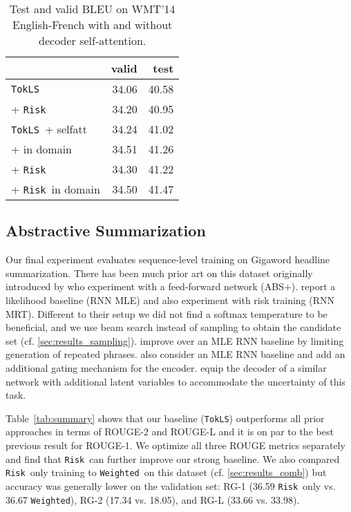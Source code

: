 \documentclass[11pt,a4paper]{article}
\newcommand{\TokLS}{\texttt{TokLS}}
\newcommand{\Risk}{\texttt{Risk}}
\newcommand{\Weighted}{\texttt{Weighted}}
\begin{document}
\begin{table}
\centering
\begin{tabular}{lrr}
\toprule
& \bf valid & \bf test \\ \midrule
\TokLS	& 34.06 & 40.58 \\
+ \Risk & 34.20 & 40.95 \\
\midrule
\TokLS~+ selfatt	& 34.24 & 41.02 \\
+ in domain & 34.51 & 41.26 \\
+ \Risk	& 34.30 & 41.22 \\
+ \Risk~in domain & 34.50 & 41.47 \\
\bottomrule
\end{tabular}
\caption{Test and valid BLEU on WMT'14 English-French with and without decoder self-attention. 
}
\label{tab:wmt}
\end{table}


\subsection{Abstractive Summarization}
\label{sec:results_summary}


Our final experiment evaluates sequence-level training on Gigaword headline summarization. 
There has been much prior art on this dataset originally introduced by \citet{rush2015abs} who experiment with a feed-forward network (ABS+).
\citet{ayana2016neural} report a likelihood baseline (RNN MLE) and also experiment with risk training (RNN MRT). Different to their setup we did not find a softmax temperature to be beneficial, and we use beam search instead of sampling to obtain the candidate set (cf. \textsection\ref{sec:results_sampling}). \citet{suzuki2017cutting} improve over an MLE RNN baseline by limiting generation of repeated phrases. \citet{zhou2017seass} also consider an MLE RNN baseline and add an additional gating mechanism for the encoder. \citet{li2017drgd} equip the decoder of a similar network with additional latent variables to accommodate the uncertainty of this task.

Table~\ref{tab:summary} shows that our baseline (\TokLS) outperforms all prior approaches in terms of ROUGE-2 and ROUGE-L and it is on par to the best previous result for ROUGE-1. We optimize all three ROUGE metrics separately and find that \Risk~can further improve our strong baseline.
We also compared \Risk~only training to \Weighted~on this dataset (cf. \textsection\ref{sec:results_comb}) but accuracy was generally lower on the validation set: RG-1 (36.59 \Risk~only vs. 36.67 \Weighted), RG-2 (17.34 vs. 18.05), and RG-L (33.66 vs. 33.98).
\end{document}
